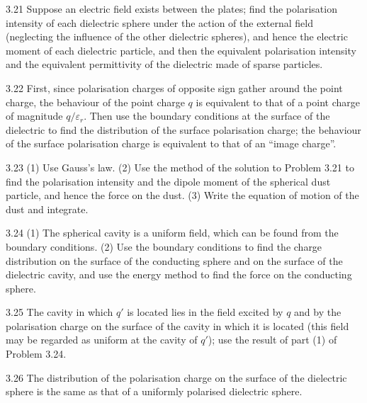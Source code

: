 \begin{hint}{3.21}
Suppose an electric field exists between the plates; find the polarisation intensity of each dielectric sphere under the action of the external field (neglecting the influence of the other dielectric spheres), and hence the electric moment of each dielectric particle, and then the equivalent polarisation intensity and the equivalent permittivity of the dielectric made of sparse particles.
\end{hint}

\begin{hint}{3.22}
First, since polarisation charges of opposite sign gather around the point charge, the behaviour of the point charge $q$ is equivalent to that of a point charge of magnitude $q/\varepsilon_r$. Then use the boundary conditions at the surface of the dielectric to find the distribution of the surface polarisation charge; the behaviour of the surface polarisation charge is equivalent to that of an ``image charge''.
\end{hint}

\begin{hint}{3.23}
(1) Use Gauss's law. (2) Use the method of the solution to Problem 3.21 to find the polarisation intensity and the dipole moment of the spherical dust particle, and hence the force on the dust. (3) Write the equation of motion of the dust and integrate.
\end{hint}

\begin{hint}{3.24}
(1) The spherical cavity is a uniform field, which can be found from the boundary conditions. (2) Use the boundary conditions to find the charge distribution on the surface of the conducting sphere and on the surface of the dielectric cavity, and use the energy method to find the force on the conducting sphere.
\end{hint}

\begin{hint}{3.25}
The cavity in which $q'$ is located lies in the field excited by $q$ and by the polarisation charge on the surface of the cavity in which it is located (this field may be regarded as uniform at the cavity of $q'$); use the result of part (1) of Problem 3.24.
\end{hint}

\begin{hint}{3.26}
The distribution of the polarisation charge on the surface of the dielectric sphere is the same as that of a uniformly polarised dielectric sphere.
\end{hint}

